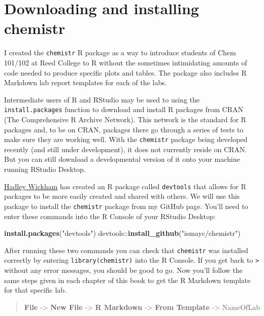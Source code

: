 \documentclass[]{tufte-book}
\newenvironment{Shaded}{\begin{snugshade}}{\end{snugshade}}
\newcommand{\KeywordTok}[1]{\textcolor[rgb]{0.13,0.29,0.53}{\textbf{{#1}}}}
\newcommand{\StringTok}[1]{\textcolor[rgb]{0.31,0.60,0.02}{{#1}}}
\newcommand{\NormalTok}[1]{{#1}}
\begin{document}
\section{Downloading and installing
chemistr}\label{downloading-and-installing-chemistr}

I created the \texttt{chemistr} R package as a way to introduce students
of Chem 101/102 at Reed College to R without the sometimes intimidating
amounts of code needed to produce specific plots and tables. The package
also includes R Markdown lab report templates for each of the labs.

Intermediate users of R and RStudio may be used to using the
\texttt{install.packages} function to download and install R packages
from CRAN (The Comprehensive R Archive Network). This network is the
standard for R packages and, to be on CRAN, packages there go through a
series of tests to make sure they are working well. With the
\texttt{chemistr} package being developed recently (and still under
development), it does not currently reside on CRAN. But you can still
download a developmental version of it onto your machine running RStudio
Desktop.

\href{http://hadley.nz/}{Hadley Wickham} has created an R package called
\texttt{devtools} that allows for R packages to be more easily created
and shared with others. We will use this package to install the
\texttt{chemistr} package from my GitHub page. You'll need to enter
these commands into the R Console of your RStudio Desktop:

\begin{Shaded}
\begin{Highlighting}[]
\KeywordTok{install.packages}\NormalTok{(}\StringTok{"devtools"}\NormalTok{)}
\NormalTok{devtools::}\KeywordTok{install_github}\NormalTok{(}\StringTok{"ismayc/chemistr"}\NormalTok{)}
\end{Highlighting}
\end{Shaded}

After running these two commands you can check that \texttt{chemistr}
was installed correctly by entering \texttt{library(chemistr)} into the
R Console. If you get back to \texttt{\textgreater{}} without any error
messages, you should be good to go. Now you'll follow the same steps
given in each chapter of this book to get the R Markdown template for
that specific lab.

\begin{quote}
\textbf{File} -\textgreater{} \textbf{New File} -\textgreater{}
\textbf{R Markdown} -\textgreater{} \textbf{From Template}
-\textgreater{} NameOfLab
\end{quote}
\end{document}
